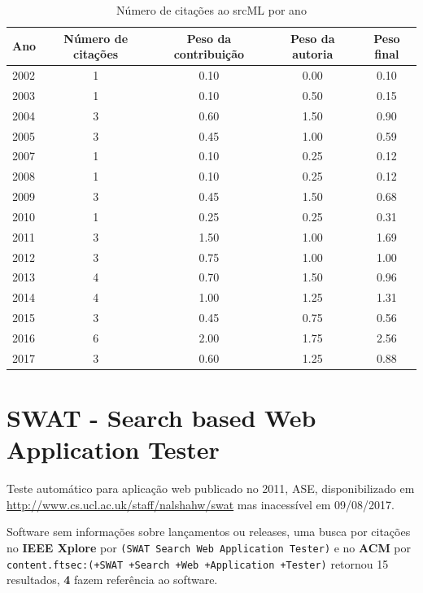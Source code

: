 \begin{table}[h]
\caption{Número de citações ao srcML por ano}
\centering
\begin{tabular}{| l | c | c | c | c |}
  \hline
  Ano & Número de citações & Peso da contribuição & Peso da autoria & Peso final \\
  \hline
  2002
    & 1
    & 0.10
    & 0.00
    & 0.10 \\
  2003
    & 1
    & 0.10
    & 0.50
    & 0.15 \\
  2004
    & 3
    & 0.60
    & 1.50
    & 0.90 \\
  2005
    & 3
    & 0.45
    & 1.00
    & 0.59 \\
  2007
    & 1
    & 0.10
    & 0.25
    & 0.12 \\
  2008
    & 1
    & 0.10
    & 0.25
    & 0.12 \\
  2009
    & 3
    & 0.45
    & 1.50
    & 0.68 \\
  2010
    & 1
    & 0.25
    & 0.25
    & 0.31 \\
  2011
    & 3
    & 1.50
    & 1.00
    & 1.69 \\
  2012
    & 3
    & 0.75
    & 1.00
    & 1.00 \\
  2013
    & 4
    & 0.70
    & 1.50
    & 0.96 \\
  2014
    & 4
    & 1.00
    & 1.25
    & 1.31 \\
  2015
    & 3
    & 0.45
    & 0.75
    & 0.56 \\
  2016
    & 6
    & 2.00
    & 1.75
    & 2.56 \\
  2017
    & 3
    & 0.60
    & 1.25
    & 0.88 \\
  \hline
\end{tabular}
\end{table}


\section{SWAT - Search based Web Application Tester}

Teste automático para aplicação web
publicado no 2011, ASE,
disponibilizado em \url{http://www.cs.ucl.ac.uk/staff/nalshahw/swat}
mas inacessível em 09/08/2017.

Software sem informações sobre lançamentos ou releases,
uma busca por citações no {\bf IEEE Xplore} por
\texttt{(SWAT Search Web Application Tester)}
e no {\bf ACM} por
\texttt{content.ftsec:(+SWAT +Search +Web +Application +Tester)}
retornou
15 resultados,
{\bf 4} fazem referência ao software.


